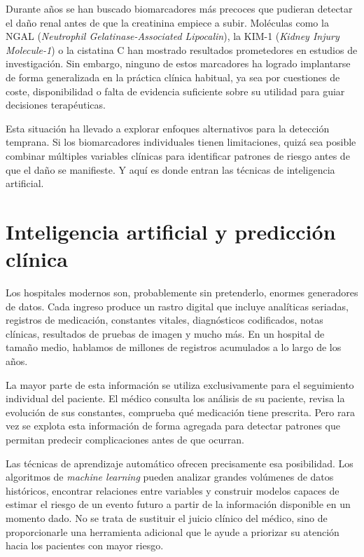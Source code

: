 \documentclass[12pt, a4paper, oneside]{report}
\begin{document}
Durante años se han buscado biomarcadores más precoces que pudieran detectar el daño renal antes de que la creatinina empiece a subir. Moléculas como la NGAL (\textit{Neutrophil Gelatinase-Associated Lipocalin}), la KIM-1 (\textit{Kidney Injury Molecule-1}) o la cistatina C han mostrado resultados prometedores en estudios de investigación. Sin embargo, ninguno de estos marcadores ha logrado implantarse de forma generalizada en la práctica clínica habitual, ya sea por cuestiones de coste, disponibilidad o falta de evidencia suficiente sobre su utilidad para guiar decisiones terapéuticas.

Esta situación ha llevado a explorar enfoques alternativos para la detección temprana. Si los biomarcadores individuales tienen limitaciones, quizá sea posible combinar múltiples variables clínicas para identificar patrones de riesgo antes de que el daño se manifieste. Y aquí es donde entran las técnicas de inteligencia artificial.

\section{Inteligencia artificial y predicción clínica}

Los hospitales modernos son, probablemente sin pretenderlo, enormes generadores de datos. Cada ingreso produce un rastro digital que incluye analíticas seriadas, registros de medicación, constantes vitales, diagnósticos codificados, notas clínicas, resultados de pruebas de imagen y mucho más. En un hospital de tamaño medio, hablamos de millones de registros acumulados a lo largo de los años.

La mayor parte de esta información se utiliza exclusivamente para el seguimiento individual del paciente. El médico consulta los análisis de su paciente, revisa la evolución de sus constantes, comprueba qué medicación tiene prescrita. Pero rara vez se explota esta información de forma agregada para detectar patrones que permitan predecir complicaciones antes de que ocurran.

Las técnicas de aprendizaje automático ofrecen precisamente esa posibilidad. Los algoritmos de \textit{machine learning} pueden analizar grandes volúmenes de datos históricos, encontrar relaciones entre variables y construir modelos capaces de estimar el riesgo de un evento futuro a partir de la información disponible en un momento dado. No se trata de sustituir el juicio clínico del médico, sino de proporcionarle una herramienta adicional que le ayude a priorizar su atención hacia los pacientes con mayor riesgo.
\end{document}
